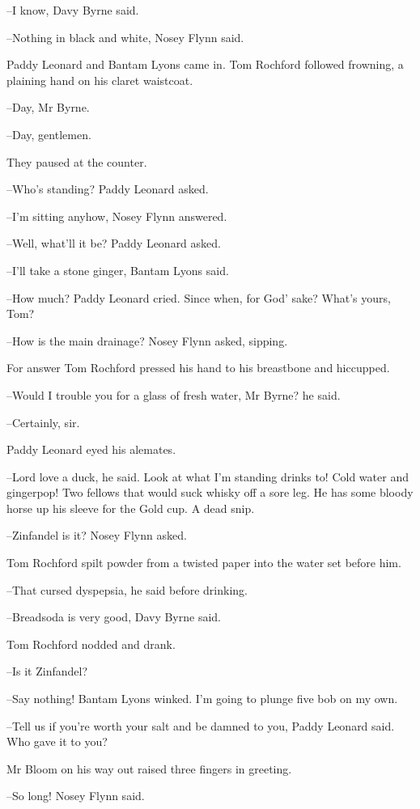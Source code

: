 --I know,
Davy Byrne said.

--Nothing in black and white,
Nosey Flynn said.

Paddy Leonard and Bantam Lyons came in.
Tom Rochford followed frowning,
a plaining hand on his claret waistcoat.

--Day, Mr Byrne.

--Day, gentlemen.

They paused at the counter.

--Who's standing?
Paddy Leonard asked.

--I'm sitting anyhow,
Nosey Flynn answered.

--Well, what'll it be?
Paddy Leonard asked.

--I'll take a stone ginger,
Bantam Lyons said.

--How much?
Paddy Leonard cried.
Since when, for God' sake?
What's yours, Tom?

--How is the main drainage?
Nosey Flynn asked, sipping.

For answer Tom Rochford pressed his hand to his breastbone and hiccupped.

--Would I trouble you for a glass of fresh water, Mr Byrne?
he said.

--Certainly, sir.

Paddy Leonard eyed his alemates.

--Lord love a duck,
he said.
Look at what I'm standing drinks to!
Cold water and gingerpop!
Two fellows that would suck whisky off a sore leg.
He has some bloody horse up his sleeve for the Gold cup.
A dead snip.

--Zinfandel is it?
Nosey Flynn asked.

Tom Rochford spilt powder from a twisted paper
into the water set before him.

--That cursed dyspepsia,
he said before drinking.

--Breadsoda is very good,
Davy Byrne said.

Tom Rochford nodded and drank.

--Is it Zinfandel?

--Say nothing!
Bantam Lyons winked.
I'm going to plunge five bob on my own.

--Tell us if you're worth your salt and be damned to you,
Paddy Leonard said.
Who gave it to you?

Mr Bloom on his way out raised three fingers in greeting.

--So long!
Nosey Flynn said.

